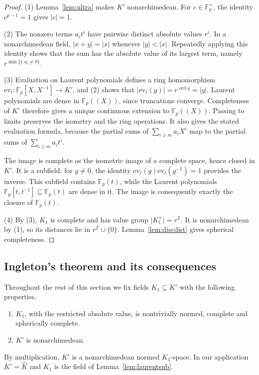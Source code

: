 \documentclass[11pt]{amsart}
\theoremstyle{definition}
\theoremstyle{remark}
\numberwithin{equation}{section}
\newcommand{\Z}{\mathbb Z}
\newcommand{\F}{\mathbb F}
\newcommand{\abs}[1]{\lvert #1\rvert}
\newcommand{\ord}{\operatorname{ord}}
\newcommand{\Kh}{\widehat K}
\begin{document}
\begin{proof}
(1) Lemma~\ref{lem:ultra} makes $K'$ nonarchimedean. For $c\in\F_p^\times$, the identity $c^{p-1}=1$ gives $\abs c=1$.

(2) The nonzero terms $a_it^i$ have pairwise distinct absolute values $r^i$. In a nonarchimedean field,
$\abs{x+y}=\abs x$ whenever $\abs y<\abs x$. Repeatedly applying this identity shows that the sum has the absolute
value of its largest term, namely $r^{\min\{i:a_i\ne0\}}$.

(3) Evaluation on Laurent polynomials defines a ring homomorphism
$\mathrm{ev}_t\colon\F_p[X,X^{-1}]\to K'$, and (2) shows that
$\abs{\mathrm{ev}_t(g)}=r^{\ord g}=\abs g$. Laurent polynomials are dense in $\F_p((X))$, since truncations converge.
Completeness of $K'$ therefore gives a unique continuous extension to $\F_p((X))$. Passing to limits preserves the
isometry and the ring operations. It also gives the stated evaluation formula, because the partial sums of
$\sum_{i\ge m}a_iX^i$ map to the partial sums of $\sum_{i\ge m}a_it^i$.

The image is complete as the isometric image of a complete space, hence closed in $K'$. It is a subfield: for
$g\ne0$, the identity $\mathrm{ev}_t(g)\mathrm{ev}_t(g^{-1})=1$ provides the inverse. This subfield contains
$\F_p(t)$, while the Laurent polynomials $\F_p[t,t^{-1}]\subseteq\F_p(t)$ are dense in it. The image is consequently
exactly the closure of $\F_p(t)$.

(4) By (3), $K_1$ is complete and has value group $\abs{K_1^\times}=r^\Z$. It is nonarchimedean by (1), so its distances
lie in $r^\Z\cup\{0\}$. Lemma~\ref{lem:discdist} gives spherical completeness.
\end{proof}

\subsection{Ingleton's theorem and its consequences}
Throughout the rest of this section we fix fields $K_1\subseteq K'$ with the following properties.
\begin{enumerate}
\item[(H1)] $K_1$, with the restricted absolute value, is nontrivially normed, complete and spherically complete.
\item[(H2)] $K'$ is nonarchimedean.
\end{enumerate}
By multiplication, $K'$ is a nonarchimedean normed $K_1$\nobreakdash-space. In our application $K'=\Kh$ and $K_1$ is the field of
Lemma~\ref{lem:laurentsub}.
\end{document}
